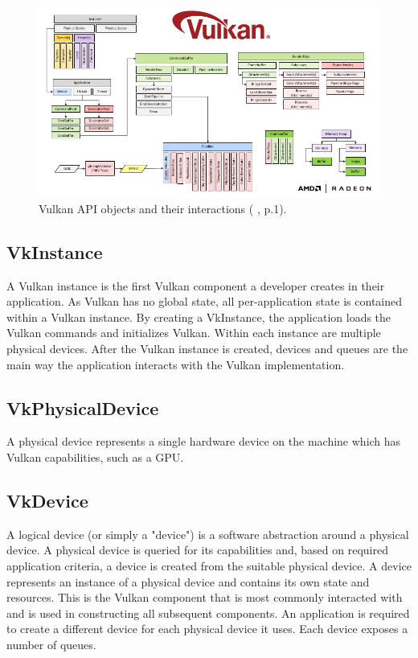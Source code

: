 \documentclass[12pt]{report}
\newcommand{\citediagram}[2]{(\citeauthor{#1} \citeyear{#1}, p.#2)}
\theoremstyle{definition}
\begin{document}
      \begin{figure}[h]
        \centering
        \includegraphics[width=\textwidth]{images/interactions.png}
        \caption{Vulkan API objects and their interactions \citediagram{vez}{1}.}
        \label{fig:interactions}  
      \end{figure}

      \subsection{VkInstance}
      
        A Vulkan instance is the first Vulkan component a developer creates in
        their application.  As Vulkan has no global state, all per-application
        state is contained within a Vulkan instance. By creating a VkInstance,
        the application loads the Vulkan commands and initializes Vulkan.
        Within each instance are multiple physical devices. After the Vulkan
        instance is created, devices and queues are the main
        way the application interacts with the Vulkan implementation.

      \subsection{VkPhysicalDevice}

        A physical device represents a single hardware device on the machine
        which has Vulkan capabilities, such as a GPU.

      \subsection{VkDevice}

        A logical device (or simply a "device") is a software abstraction around a
        physical device. A physical device is queried for its capabilities and,
        based on required application criteria, a device is created from the
        suitable physical device. A device represents an instance of a
        physical device and contains its own state and resources. This is
        the Vulkan component that is most commonly interacted with and is
        used in constructing all subsequent components. An application is
        required to create a different device for each physical device it uses.
        Each device exposes a number of queues.
\end{document}
